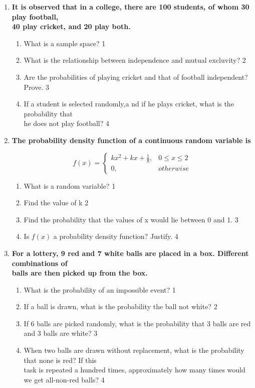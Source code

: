 \documentclass{article}
\begin{document}
\begin{enumerate}
  \item
  \textbf{It is observed that in a college, there are 100 students, of whom 30 play football, \\ 40 play cricket, and 20 play both.}
 
  \begin{enumerate}
    \item
	What is a sample space? \hfill 1
    \item
    	What is the relationship between independence and mutual excluvity?  \hfill 2
    \item
    	Are the probabilities of playing cricket and that of football independent? Prove. \hfill 3
     \item
     	If a student is selected randomly,a nd if he plays cricket, what is the probability that \\ he does not play football? \hfill 4
  \end{enumerate}

 \item
  \textbf{The probability density function of a continuous random variable is}

$$
  f(x) =
\begin{cases}
kx^2+kx+ \frac 18,  & 0 \le x \le 2 \\
0, & otherwise
\end{cases}
$$

  \begin{enumerate}
    \item
	What is a random variable? \hfill 1
    \item
    	Find the value of k \hfill 2
    \item
    	Find the probability that the values of x would lie between 0 and 1. \hfill 3
     \item
     	Is $f(x)$ a probability density function? Justify.  \hfill 4
  \end{enumerate}

  \item
  \textbf{For a lottery, 9 red and 7 white balls are placed in a box. Different combinations of \\  balls are then picked up from the box.}
 
  \begin{enumerate}
    \item
	What is the probability of an impossible event? \hfill 1
    \item
    	If a ball is drawn, what is the probability the ball not white? \hfill 2
    \item
    	If 6 balls are picked randomly, what is the probability that 3 balls are red and 3 balls are white? \hfill 3
     \item
     	When two balls are drawn without replacement, what is the probability that none is red? If this \\ task is repeated a hundred times, approximately how many times would we get all-non-red balls? \hfill 4
  \end{enumerate}


\end{enumerate}
\end{document}
